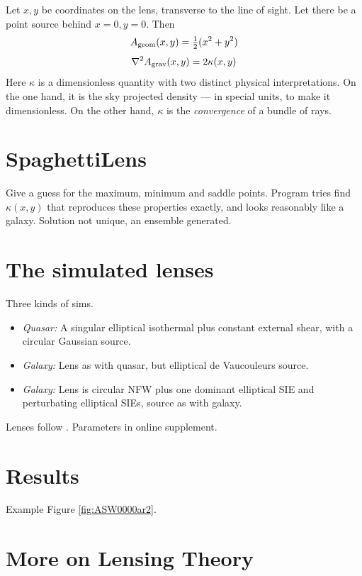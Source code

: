 \documentclass[12pt,preprint]{aastex}
\def\half{{\textstyle\frac12}}
\begin{document}
Let $x,y$ be coordinates on the lens, transverse to the line of sight.
Let there be a point source behind $x=0,y=0$.  Then
\begin{equation}
A_{\rm geom}(x,y) = \half(x^2 + y^2)
\end{equation}
\begin{equation}
\nabla^2 A_{\rm grav}(x,y) = 2\kappa(x,y)
\end{equation}
Here $\kappa$ is a dimensionless quantity with two distinct physical
interpretations.  On the one hand, it is the sky projected density ---
in special units, to make it dimensionless.  On the other hand,
$\kappa$ is the {\em convergence\/} of a bundle of rays.

\section{SpaghettiLens}

Give a guess for the maximum, minimum and saddle points.  Program
tries find $\kappa(x,y)$ that reproduces these properties exactly, and
looks reasonably like a galaxy.  Solution not unique, an ensemble
generated.

\section{The simulated lenses}

Three kinds of sims.

\begin{itemize}
\item {\em Quasar:\/} A singular elliptical isothermal plus constant
  external shear, with a circular Gaussian source.
\item {\em Galaxy:\/} Lens as with quasar, but elliptical de
  Vaucouleurs source.
\item {\em Galaxy:\/} Lens is circular NFW plus one dominant
  elliptical SIE and perturbating elliptical SIEs, source as with
  galaxy.
\end{itemize}
Lenses follow \cite{2001astro.ph..2341K,2001astro.ph..2340K}.
Parameters in online supplement.

\section{Results}

Example Figure \ref{fig:ASW0000ar2}.

\appendix

\section{More on Lensing Theory}
\end{document}
